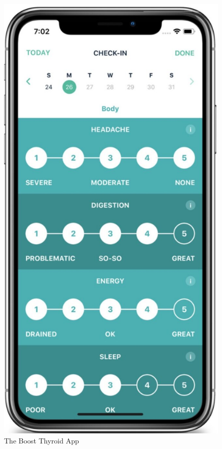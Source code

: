 \documentclass{article}
\begin{document}
\begin{figure}[H]
\centering
\includegraphics[scale= .2]{img/boostThyroid.PNG}
\caption{The Boost Thyroid App}
\label{fig:boost} 
\end{figure}
\end{document}
